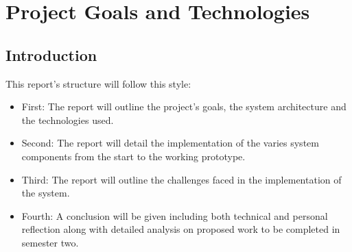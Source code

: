 \chapter{Project Goals and Technologies}
\label{chap:intro}


\section{Introduction}
\begin{flushleft}
	This report's structure will follow this style:
	\begin{itemize}
		\item First: The report will outline the project's goals, the system architecture and the technologies used.
		\item Second: The report will detail the implementation of the varies system components from the start to the working prototype.
		\item Third: The report will outline the challenges faced in the implementation of the system.
		\item Fourth: A conclusion will be given including both technical and personal reflection along with detailed analysis on proposed work to be completed in
		      semester two.
	\end{itemize}

\end{flushleft}
